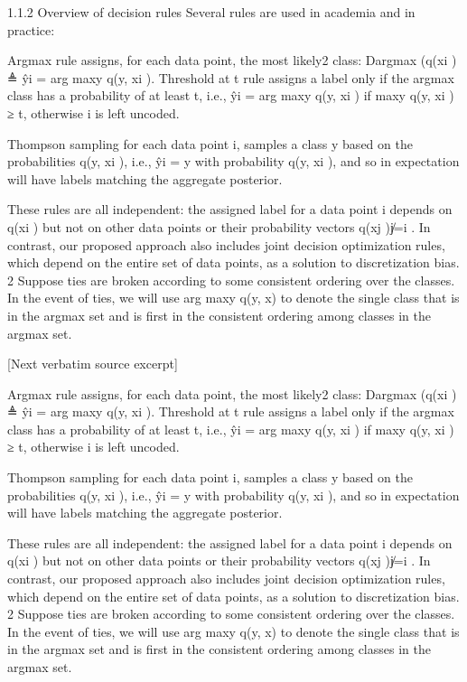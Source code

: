 \documentclass[10pt]{article}
\begin{document}
\begin{ReviewVerbatim}
1.1.2    Overview of decision rules
Several rules are used in academia and in practice:

Argmax rule assigns, for each data point, the most likely2 class: Dargmax ({q(xi }) ≜ {ŷi = arg maxy q(y, xi )}.
Threshold at t rule assigns a label only if the argmax class has a probability of at least t, i.e., ŷi =
    arg maxy q(y, xi ) if maxy q(y, xi ) ≥ t, otherwise i is left uncoded.

Thompson sampling for each data point i, samples a class y based on the probabilities q(y, xi ), i.e., ŷi = y
    with probability q(y, xi ), and so in expectation will have labels matching the aggregate posterior.

    These rules are all independent: the assigned label for a data point i depends on q(xi ) but not on other
data points or their probability vectors {q(xj )}j̸=i .
    In contrast, our proposed approach also includes joint decision optimization rules, which depend on the
entire set of data points, as a solution to discretization bias.
   2 Suppose ties are broken according to some consistent ordering over the classes.      In the event of ties, we will use
arg maxy q(y, x) to denote the single class that is in the argmax set and is first in the consistent ordering among classes
in the argmax set.

[Next verbatim source excerpt]

Argmax rule assigns, for each data point, the most likely2 class: Dargmax ({q(xi }) ≜ {ŷi = arg maxy q(y, xi )}.
Threshold at t rule assigns a label only if the argmax class has a probability of at least t, i.e., ŷi =
    arg maxy q(y, xi ) if maxy q(y, xi ) ≥ t, otherwise i is left uncoded.

Thompson sampling for each data point i, samples a class y based on the probabilities q(y, xi ), i.e., ŷi = y
    with probability q(y, xi ), and so in expectation will have labels matching the aggregate posterior.

    These rules are all independent: the assigned label for a data point i depends on q(xi ) but not on other
data points or their probability vectors {q(xj )}j̸=i .
    In contrast, our proposed approach also includes joint decision optimization rules, which depend on the
entire set of data points, as a solution to discretization bias.
   2 Suppose ties are broken according to some consistent ordering over the classes.      In the event of ties, we will use
arg maxy q(y, x) to denote the single class that is in the argmax set and is first in the consistent ordering among classes
in the argmax set.
\end{ReviewVerbatim}
\end{document}
